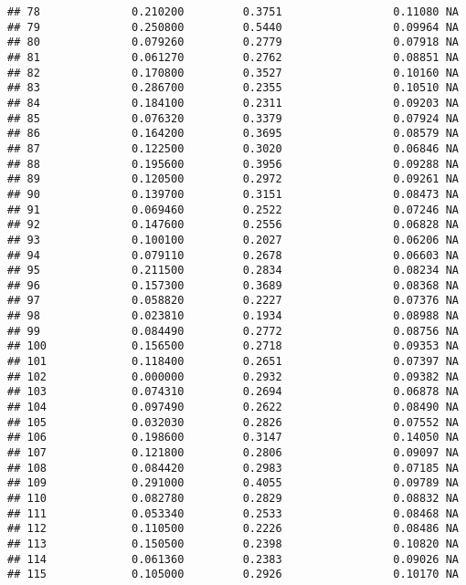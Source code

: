 \documentclass[
]{article}
\begin{document}
\begin{verbatim}
## 78              0.210200         0.3751                 0.11080 NA
## 79              0.250800         0.5440                 0.09964 NA
## 80              0.079260         0.2779                 0.07918 NA
## 81              0.061270         0.2762                 0.08851 NA
## 82              0.170800         0.3527                 0.10160 NA
## 83              0.286700         0.2355                 0.10510 NA
## 84              0.184100         0.2311                 0.09203 NA
## 85              0.076320         0.3379                 0.07924 NA
## 86              0.164200         0.3695                 0.08579 NA
## 87              0.122500         0.3020                 0.06846 NA
## 88              0.195600         0.3956                 0.09288 NA
## 89              0.120500         0.2972                 0.09261 NA
## 90              0.139700         0.3151                 0.08473 NA
## 91              0.069460         0.2522                 0.07246 NA
## 92              0.147600         0.2556                 0.06828 NA
## 93              0.100100         0.2027                 0.06206 NA
## 94              0.079110         0.2678                 0.06603 NA
## 95              0.211500         0.2834                 0.08234 NA
## 96              0.157300         0.3689                 0.08368 NA
## 97              0.058820         0.2227                 0.07376 NA
## 98              0.023810         0.1934                 0.08988 NA
## 99              0.084490         0.2772                 0.08756 NA
## 100             0.156500         0.2718                 0.09353 NA
## 101             0.118400         0.2651                 0.07397 NA
## 102             0.000000         0.2932                 0.09382 NA
## 103             0.074310         0.2694                 0.06878 NA
## 104             0.097490         0.2622                 0.08490 NA
## 105             0.032030         0.2826                 0.07552 NA
## 106             0.198600         0.3147                 0.14050 NA
## 107             0.121800         0.2806                 0.09097 NA
## 108             0.084420         0.2983                 0.07185 NA
## 109             0.291000         0.4055                 0.09789 NA
## 110             0.082780         0.2829                 0.08832 NA
## 111             0.053340         0.2533                 0.08468 NA
## 112             0.110500         0.2226                 0.08486 NA
## 113             0.150500         0.2398                 0.10820 NA
## 114             0.061360         0.2383                 0.09026 NA
## 115             0.105000         0.2926                 0.10170 NA

\end{verbatim}
\end{document}
